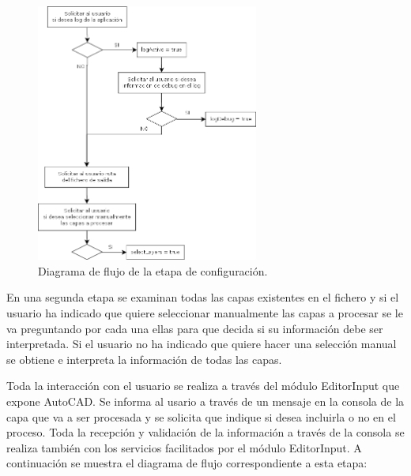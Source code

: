 \begin{itemize}
{\begin{figure}[H]
\begin{center}
\includegraphics[width=0.65\textwidth]{imgs/diagramaFlujo}
\caption{Diagrama de flujo de la etapa de configuración.}
\end{center}
\end{figure}

En una segunda etapa se examinan todas las capas existentes en el fichero y si el usuario ha indicado que quiere seleccionar manualmente las capas a procesar se le va preguntando por cada una ellas para que decida si su información debe ser interpretada. Si el usuario no ha indicado que quiere hacer una selección manual se obtiene e interpreta la información de todas las capas. 

Toda la interacción con el usuario se realiza a través del módulo EditorInput que expone AutoCAD. Se informa al usario a través de un mensaje en la consola de la capa que va a ser procesada y se solicita que indique si desea incluirla o no en el proceso. Toda la recepción y validación de la información a través de la consola se realiza también con los servicios facilitados por el módulo EditorInput. A continuación se muestra el diagrama de flujo correspondiente a esta etapa:

}
\end{itemize}
